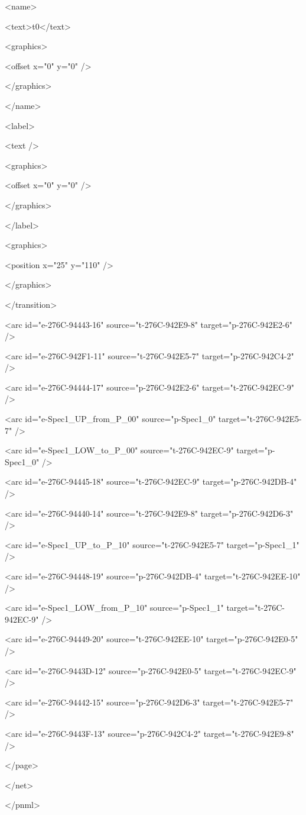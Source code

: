 {<name>

<text>t0</text>

<graphics>

<offset x="0" y="0" />

</graphics>

</name>

<label>

<text />

<graphics>

<offset x="0" y="0" />

</graphics>

</label>

<graphics>

<position x="25" y="110" />

</graphics>

</transition>

<arc id="e-276C-94443-16" source="t-276C-942E9-8" target="p-276C-942E2-6" />

<arc id="e-276C-942F1-11" source="t-276C-942E5-7" target="p-276C-942C4-2" />

<arc id="e-276C-94444-17" source="p-276C-942E2-6" target="t-276C-942EC-9" />

<arc id="e-Spec1\_UP\_from\_P\_00" source="p-Spec1\_0" target="t-276C-942E5-7" />

<arc id="e-Spec1\_LOW\_to\_P\_00" source="t-276C-942EC-9" target="p-Spec1\_0" />

<arc id="e-276C-94445-18" source="t-276C-942EC-9" target="p-276C-942DB-4" />

<arc id="e-276C-94440-14" source="t-276C-942E9-8" target="p-276C-942D6-3" />

<arc id="e-Spec1\_UP\_to\_P\_10" source="t-276C-942E5-7" target="p-Spec1\_1" />

<arc id="e-276C-94448-19" source="p-276C-942DB-4" target="t-276C-942EE-10" />

<arc id="e-Spec1\_LOW\_from\_P\_10" source="p-Spec1\_1" target="t-276C-942EC-9" />

<arc id="e-276C-94449-20" source="t-276C-942EE-10" target="p-276C-942E0-5" />

<arc id="e-276C-9443D-12" source="p-276C-942E0-5" target="t-276C-942EC-9" />

<arc id="e-276C-94442-15" source="p-276C-942D6-3" target="t-276C-942E5-7" />

<arc id="e-276C-9443F-13" source="p-276C-942C4-2" target="t-276C-942E9-8" />

</page>

</net>

</pnml>
}
